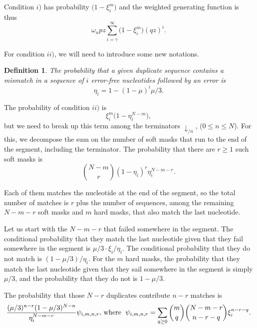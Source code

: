 \documentclass{article}
\newtheorem{definition}{Definition}
\begin{document}
Condition $i)$ has probability $\big(1 - \xi_i^m \big)$ and the
weighted generating function is thus
\begin{equation*}
\omega_n pz \sum_{i=\gamma}^\infty \Big(1 - \xi_i^m \Big) (qz)^i.
\end{equation*}

For condition $ii)$, we will need to introduce some new notations.
\begin{definition}
The probability that a given duplicate sequence contains a mismatch in a
sequence of $i$ error-free nucleotides followed by an error is
\begin{equation}
\label{eq:eta}
\eta_i = 1-(1-\mu)^i\mu/3.
\end{equation}
\end{definition}

The probability of condition $ii)$ is
\begin{equation*}
\xi_i^m \Big(1 - \eta_i^{N-m} \Big),
\end{equation*}
but we need to break up this term among the terminators $\downarrow_{/n}$,
($0 \leq n \leq N$). For this, we decompose the sum on the number of soft
masks that run to the end of the segment, including the terminator. The
probability that there are $r \geq 1$ such soft masks is
\begin{equation*}
{N-m \choose r} (1 - \eta_i)^r \eta_i^{N-m-r}.
\end{equation*}

Each of them matches the nucleotide at the end of the segment, so the
total number of matches is $r$ plus the number of sequences, among the
remaining $N-m-r$ soft masks and $m$ hard masks, that also match the
last nucleotide.

Let us start with the $N-m-r$ that failed somewhere in the segment. The
conditional probability that they match the last nucleotide given that
they fail somewhere in the segment is $\mu/3 \cdot \xi_i / \eta_i$. The
conditional probability that they do not match is $(1-\mu/3) / \eta_i$.
For the $m$ hard masks, the probability that they match the last
nucleotide given that they sail somewhere in the segment is simply
$\mu/3$, and the probability that they do not is $1-\mu/3$.

The probability that those $N-r$ duplicates contribute $n-r$ matches is
\begin{equation*}
\frac{(\mu/3)^{n-r}(1-\mu/3)^{N-n}}{\eta_i^{N-m-r}}
\psi_{i,m,n,r}\text{, where \;}
\psi_{i,m,n,r} = \sum_{q \geq 0}{m \choose q}{N-m-r \choose n-r-q}
\xi_i^{n-r-q}.
\end{equation*}
\end{document}
